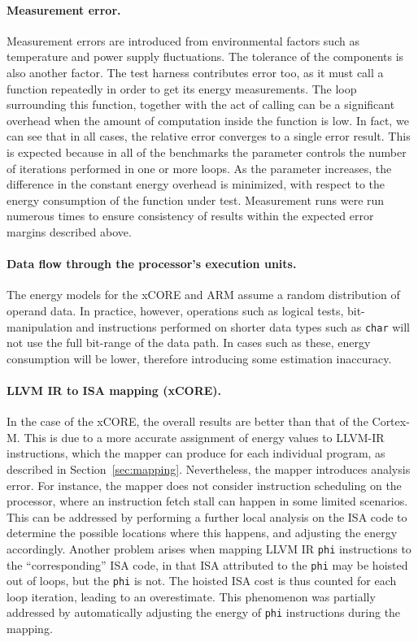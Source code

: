 \documentclass[9pt,preprint]{sigplanconf}
\newcommand{\secref}[1]{Section~\ref{sec:#1}}
\begin{document}
\paragraph{Measurement error.}
Measurement errors are introduced from environmental factors such as temperature
and power supply fluctuations. The tolerance of the components is also another
factor. The test harness contributes error too, as it must call a
function repeatedly in order to get its energy measurements. The loop
surrounding this function, together with the act of calling can be a significant
overhead when the amount of computation inside the function is low. In fact, we
can see that in all cases, the relative error converges to
a single error result. This is expected because in all of the benchmarks the
parameter controls the number of iterations performed in one or more loops. As
the parameter increases, the difference in the constant energy overhead is
minimized, with respect to the energy consumption of the function under test.
Measurement runs were run numerous times to ensure consistency of results within
the expected error margins described above.


\paragraph{Data flow through the processor's execution units.}
The energy models for the xCORE and ARM assume a random distribution of operand
data. In practice, however, operations such as logical tests, bit-manipulation
and instructions performed on shorter data types such as \texttt{char} will not
use the full bit-range of the data path. In cases such as these, energy consumption will
be lower, therefore introducing some estimation inaccuracy.


\paragraph{LLVM IR to ISA mapping (xCORE).}
In the case of the xCORE, the overall results are better than that of the
Cortex-M. This is due to a more accurate assignment of energy values to LLVM-IR
instructions, which the mapper can produce for each individual program, as
described in \secref{mapping}.
Nevertheless, the mapper introduces analysis error. For instance, the mapper does
not consider instruction scheduling on the processor, where an instruction fetch
stall can happen in some limited scenarios. This can be addressed by
performing a further local analysis on the ISA code to determine the possible
locations where this happens, and adjusting the energy accordingly.
Another problem arises when mapping LLVM IR \texttt{phi} instructions to the
``corresponding'' ISA code, in that ISA attributed to the \texttt{phi} may be
hoisted out of loops, but the \texttt{phi} is not. The hoisted ISA cost is
thus counted for each loop iteration, leading to an overestimate. This
phenomenon was partially addressed by automatically adjusting the energy of
\texttt{phi} instructions during the mapping.
\end{document}
